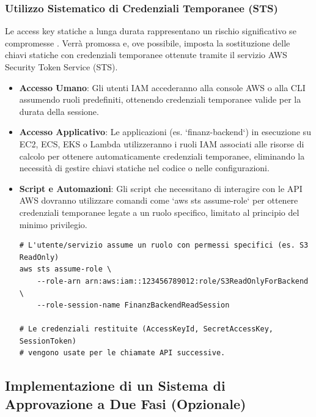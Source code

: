 \documentclass[a4paper,12pt]{report}
\begin{document}
\subsubsection{Utilizzo Sistematico di Credenziali Temporanee (STS)}

Le access key statiche a lunga durata rappresentano un rischio significativo se compromesse \cite{kazi:leastprivilege}. Verrà promossa e, ove possibile, imposta la sostituzione delle chiavi statiche con credenziali temporanee ottenute tramite il servizio AWS Security Token Service (STS).
\begin{itemize}
    \item \textbf{Accesso Umano}: Gli utenti IAM accederanno alla console AWS o alla CLI assumendo ruoli predefiniti, ottenendo credenziali temporanee valide per la durata della sessione.
    \item \textbf{Accesso Applicativo}: Le applicazioni (es. `finanz-backend`) in esecuzione su EC2, ECS, EKS o Lambda utilizzeranno i ruoli IAM associati alle risorse di calcolo per ottenere automaticamente credenziali temporanee, eliminando la necessità di gestire chiavi statiche nel codice o nelle configurazioni.
    \item \textbf{Script e Automazioni}: Gli script che necessitano di interagire con le API AWS dovranno utilizzare comandi come `aws sts assume-role` per ottenere credenziali temporanee legate a un ruolo specifico, limitato al principio del minimo privilegio.
    \begin{lstlisting}[style=bash, caption={Ottenere credenziali temporanee tramite STS AssumeRole}, label=lst:sts-assume-role]
# L'utente/servizio assume un ruolo con permessi specifici (es. S3 ReadOnly)
aws sts assume-role \
    --role-arn arn:aws:iam::123456789012:role/S3ReadOnlyForBackend \
    --role-session-name FinanzBackendReadSession
    
# Le credenziali restituite (AccessKeyId, SecretAccessKey, SessionToken)
# vengono usate per le chiamate API successive.
    \end{lstlisting}
\end{itemize}

\subsection{Implementazione di un Sistema di Approvazione a Due Fasi (Opzionale)}
\end{document}
